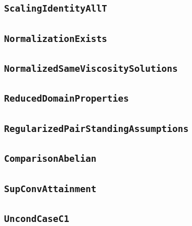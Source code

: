 \documentclass[11pt]{amsart}
\theoremstyle{definition}
\begin{document}
\subsection{\texorpdfstring{\texttt{ScalingIdentityAllT}}{ScalingIdentityAllT}}\label{node:ScalingIdentityAllT}


\subsection{\texorpdfstring{\texttt{NormalizationExists}}{NormalizationExists}}\label{node:NormalizationExists}


\subsection{\texorpdfstring{\texttt{NormalizedSameViscositySolutions}}{NormalizedSameViscositySolutions}}\label{node:NormalizedSameViscositySolutions}


\subsection{\texorpdfstring{\texttt{ReducedDomainProperties}}{ReducedDomainProperties}}\label{node:ReducedDomainProperties}


\subsection{\texorpdfstring{\texttt{RegularizedPairStandingAssumptions}}{RegularizedPairStandingAssumptions}}\label{node:RegularizedPairStandingAssumptions}


\subsection{\texorpdfstring{\texttt{ComparisonAbelian}}{ComparisonAbelian}}\label{node:ComparisonAbelian}


\subsection{\texorpdfstring{\texttt{SupConvAttainment}}{SupConvAttainment}}\label{node:SupConvAttainment}


\subsection{\texorpdfstring{\texttt{UncondCaseC1}}{UncondCaseC1}}\label{node:UncondCaseC1}

\end{document}
